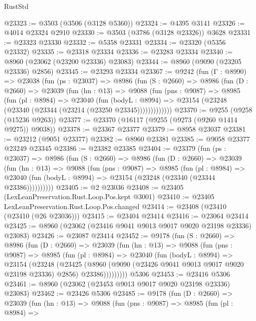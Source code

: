 \begin{lexlean}{RustStd}
\begin{coremodule}
@23323 := @3503 (@3506 (@3128 @5360))
@23324 := @4395 @3141
@23326 := @4014 @23324 @2910
@23330 := @3503 (@3786 (@3128 @23326)) @3628
@23331 := @23323 @23330
@23332 := @5358 @23331
@23334 := @23320 (@5356 @23332)
@23335 := @23318 @23334
@23336 := @23283 @23334
@23340 := @8960 (@23062 (@23200 @23336) @23083)
@23344 := @8960 (@9090 (@23205 @23336) @2856)
@23345 := @23293 @23334
@23367 := @9242
    (fun (Γ : @8990) =>
    @23038
      (fun (ps : @23037) =>
      @8986
        (fun (S : @2660) =>
        @8986
          (fun (D : @2660) =>
          @23039
            (fun (hn : @13) =>
            @9088
              (fun (pns : @9087) =>
              @8985
                (fun (pl : @8984) =>
                @23040
                  (fun (bodyL : @8994) =>
                  @23154 (@23248 (@23340 (@23344 (@23214 (@23250 @23345)))))))))))))
@23370 := @9255 (@9258 (@15236 @9263))
@23377 := @23370 (@16117 (@9255 (@9273 (@9260 @1414 @9275)) @9038))
@23378 := @23367 @23377
@23379 := @8958 @23037
@23381 := @23212 (@9051 @23377)
@23382 := @8960 @23381
@23385 := @9058 @23377 @23249 @23345
@23386 := @23382 @23385
@23404 := @23379
    (fun (ps : @23037) =>
    @8986
      (fun (S : @2660) =>
      @8986
        (fun (D : @2660) =>
        @23039
          (fun (hn : @13) =>
          @9088
            (fun (pns : @9087) =>
            @8985
              (fun (pl : @8984) =>
              @23040 (fun (bodyL : @8994) => @23154 (@23248 (@23340 (@23344 @23386))))))))))
@23405 := @2 @23036
@23408 := @23405 (LexLeanPreservation.Rust.Loop.Pos.kept @3001)
@23410 := @23405 LexLeanPreservation.Rust.Loop.Pos.changed
@23414 := @23408 (@23410 (@23410 (@26 @23036)))
@23415 := @23404 @23414
@23416 := @23064 @23414
@23425 := @8960 (@23062 (@23416 @9041 @9013 @9017 @9020 @23198 @23336) @23083)
@23426 := @23087 @23414
@23452 := @9178
    (fun (S : @2660) =>
    @8986
      (fun (D : @2660) =>
      @23039
        (fun (hn : @13) =>
        @9088
          (fun (pns : @9087) =>
          @8985
            (fun (pl : @8984) =>
            @23040
              (fun (bodyL : @8994) =>
              @23154
                (@23248
                  (@23425
                    (@8960
                      (@9090 (@23426 @9041 @9013 @9017 @9020 @23198 @23336) @2856)
                      @23386)))))))))
    @5306
@23453 := @23416 @5306
@23461 := @8960 (@23062 (@23453 @9013 @9017 @9020 @23198 @23336) @23083)
@23462 := @23426 @5306
@23485 := @9178
    (fun (D : @2660) =>
    @23039
      (fun (hn : @13) =>
      @9088
        (fun (pns : @9087) =>
        @8985
          (fun (pl : @8984) =>

\end{coremodule}
\end{lexlean}
